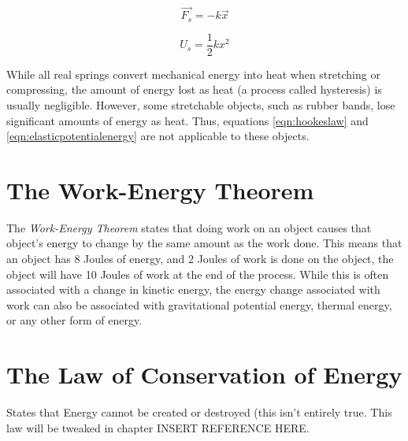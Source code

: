	
		\begin{mdframed}[backgroundcolor=orange!20!white]
		\begin{equation}
		\overrightarrow{F_s} = -k\vec{x}
		\label{eqn:hookeslaw}
		\end{equation}
	\end{mdframed}
	
	
	\begin{mdframed}[backgroundcolor=orange!20!white]
		\begin{equation}
		U_s = \frac{1}{2}kx^2
		\label{eqn:elasticpotentialenergy}
		\end{equation}
	\end{mdframed}

	While all real springs convert mechanical energy into heat when stretching or compressing, the amount of energy lost as heat (a process called hysteresis) is usually negligible.  However, some stretchable objects, such as rubber bands, lose significant amounts of energy as heat.  Thus, equations \ref{eqn:hookeslaw} and \ref{eqn:elasticpotentialenergy} are not applicable to these objects.  
	
	\section{The Work-Energy Theorem}
	The \textit{Work-Energy Theorem} states that doing work on an object causes that object's energy to change by the same amount as the work done.  This means that an object has 8 Joules of energy, and 2 Joules of work is done on the object, the object will have 10 Joules of work at the end of the process.  	While this is often associated with a change in kinetic energy, the energy change associated with work can also be associated with gravitational potential energy, thermal energy, or any other form of energy.  
	
	\section{The Law of Conservation of Energy}
	States that Energy cannot be created or destroyed (this isn't entirely true.  This law will be tweaked in chapter \color{red} INSERT REFERENCE HERE. \color{black}
	 
	

		


	


